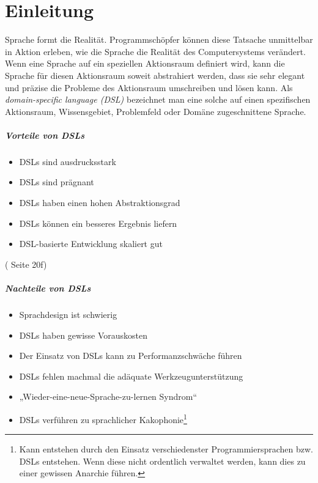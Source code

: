 \chapter{Einleitung}

Sprache formt die Realität. Programmschöpfer können diese Tatsache unmittelbar
in Aktion erleben, wie die Sprache die Realität des Computersystems verändert.
Wenn eine Sprache auf ein speziellen Aktionsraum definiert wird, kann die
Sprache für diesen Aktionsraum soweit abstrahiert werden, dass sie sehr
elegant und präzise die Probleme des Aktionsraum umschreiben und lösen kann.
Als \emph{domain-specific language (DSL)} bezeichnet man eine solche auf
einen spezifischen Aktionsraum, Wissensgebiet, Problemfeld oder Domäne
zugeschnittene Sprache.

\paragraph{Vorteile von DSLs}

\begin{itemize}
  \item DSLs sind ausdrucksstark
  \item DSLs sind prägnant
  \item DSLs haben einen hohen Abstraktionsgrad
  \item DSLs können ein besseres Ergebnis liefern
  \item DSL-basierte Entwicklung skaliert gut
\end{itemize}

(\cite{dsls} Seite 20f)

\paragraph{Nachteile von DSLs}

\begin{itemize}
  \item Sprachdesign ist schwierig
  \item DSLs haben gewisse Vorauskosten
  \item Der Einsatz von DSLs kann zu Performanzschwäche führen
  \item DSLs fehlen machmal die adäquate Werkzeugunterstützung
  \item „Wieder-eine-neue-Sprache-zu-lernen Syndrom“
  \item DSLs verführen zu sprachlicher Kakophonie\footnote{
        Kann entstehen durch den Einsatz verschiedenster
        Programmiersprachen bzw. DSLs entstehen.
        Wenn diese nicht ordentlich verwaltet werden, kann
        dies zu einer gewissen Anarchie führen.}
\end{itemize}

